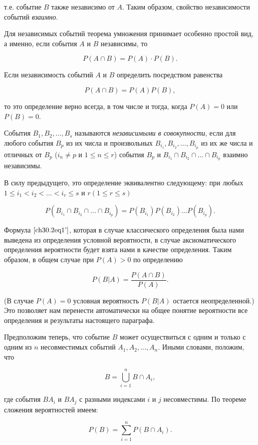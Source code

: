 т.е. событие $B$ также независимо от $A$. Таким образом, свойство независимости событий \textit{взаимно}.

Для независимых событий теорема умножения принимает особенно простой вид, а именно, если события $A$ и $B$ независимы, то

$$
P(A\cap B) = P(A) \cdot P(B).
$$

Если независимость событий $A$ и $B$ определить посредством равенства

$$
P(A\cap B) = P(A)P(B),
$$

то это определение верно всегда, в том числе и тогда, когда $P(A) = 0$ или $P(B) = 0$.

События $B_1,B_2, \ldots, B_s$ называются \textit{независимыми в совокупности}, если для любого события $B_p$ из их числа и произвольных $B_{i_1}, B_{i_2}, \ldots, B_{i_p}$ из их же числа и отличных от $B_p$  ($i_n \not= p$  и $1 \le n \le r$) события $B_p$ и $B_{i_1}\cap B_{i_2}\cap \ldots\cap B_{i_p}$ взаимно независимы.

В силу предыдущего, это определение эквивалентно следующему: при любых $1 \le i_1 < i_2 < \ldots < i_r \le s$ и $r(1 \le r \le s)$

$$
P(B_{i_1}\cap B_{i_2}\cap\ldots\cap B_{i_p}) = P(B_{i_1})P(B_{i_2}) \ldots P(B_{i_p}).
$$

Формула $\eqref{ch30.2eq1'}$, которая в случае классического определения была нами выведена из определения условной вероятности, в случае аксиоматического определения вероятности будет взята нами в качестве определения. Таким образом, в общем случае при $P(A) > 0$ по определению

$$
P(B|A) = \frac{P(A\cap B)}{P(A)}.
$$

(В случае $P(A) = 0$ условная вероятность $P(B|A)$ остается неопределенной.) Это позволяет нам перенести автоматически на общее понятие вероятности все определения и результаты настоящего параграфа.

Предположим теперь, что событие $B$ может осуществиться с одним и только с одним из $n$ несовместимых событий $A_1,A_2, \ldots, A_n$. Иными словами, положим, что

\begin{equation} \label{ch30.2eq5}
B = \bigcup\limits_{i = 1}^{n} B \cap A_i,
\end{equation}

где события $BA_i$ и $BA_j$ с разными индексами $i$ и $j$ несовместимы. По теореме сложения вероятностей имеем:

$$
P(B) = \sum_{i = 1}^{n} P(B\cap A_i).
$$

